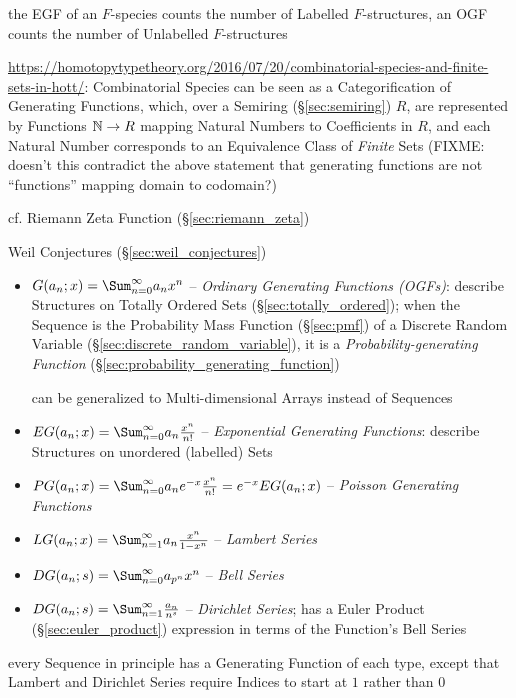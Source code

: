the EGF of an $F$-species counts the number of Labelled $F$-structures, an OGF
counts the number of Unlabelled $F$-structures

\url{https://homotopytypetheory.org/2016/07/20/combinatorial-species-and-finite-sets-in-hott/}:
Combinatorial Species can be seen as a Categorification of Generating Functions,
which, over a Semiring (\S\ref{sec:semiring}) $R$, are represented by Functions
$\mathbb{N} \rightarrow R$ mapping Natural Numbers to Coefficients in $R$, and each
Natural Number corresponds to an Equivalence Class of \emph{Finite} Sets
(FIXME: doesn't this contradict the above statement that generating functions
are not ``functions'' mapping domain to codomain?)

\fist cf. Riemann Zeta Function (\S\ref{sec:riemann_zeta})

\fist Weil Conjectures (\S\ref{sec:weil_conjectures})

\begin{itemize}
  \item $G(a_n; x) = \Sum_{n=0}^\infty a_n x^n$ -- \emph{Ordinary Generating
    Functions (OGFs)}: describe Structures on Totally Ordered Sets
    (\S\ref{sec:totally_ordered}); when the Sequence is the Probability Mass
    Function (\S\ref{sec:pmf}) of a Discrete Random Variable
    (\S\ref{sec:discrete_random_variable}), it is a \emph{Probability-generating
      Function} (\S\ref{sec:probability_generating_function})

    can be generalized to Multi-dimensional Arrays instead of Sequences
  \item $EG(a_n; x) = \Sum_{n=0}^\infty a_n \frac{x^n}{n!}$ -- \emph{Exponential
    Generating Functions}: describe Structures on unordered (labelled) Sets
  \item $PG(a_n; x) = \Sum_{n=0}^\infty a_n e^{-x}\frac{x^n}{n!} = e^{-x}EG(a_n; x)$
    -- \emph{Poisson Generating Functions}
  \item $LG(a_n; x) = \Sum_{n=1}^\infty a_n \frac{x^n}{1 - x^n}$ --
    \emph{Lambert Series}
  \item $DG(a_n; s) = \Sum_{n=0}^\infty a_{p^n} x^n$ -- \emph{Bell Series}
  \item $DG(a_n; s) = \Sum_{n=1}^\infty \frac{a_n}{n^s}$ --
    \emph{Dirichlet Series}; has a Euler Product (\S\ref{sec:euler_product})
    expression in terms of the Function's Bell Series
\end{itemize}

every Sequence in principle has a Generating Function of each type, except that
Lambert and Dirichlet Series require Indices to start at $1$ rather than $0$



